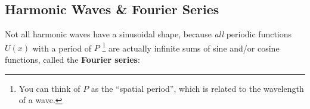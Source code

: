 %
%
%
%
%
%
%
%
%
%
%
\subsection{Harmonic Waves \& Fourier Series}
Not all harmonic waves have a sinusoidal shape, because \emph{all} periodic
functions $U(x)$ with a period of $P$ \footnote{You can think of $P$ as the
``spatial period'', which is related to the wavelength of a wave.} are
actually infinite sums of sine and/or cosine functions, called the
\textbf{Fourier series}:
%


